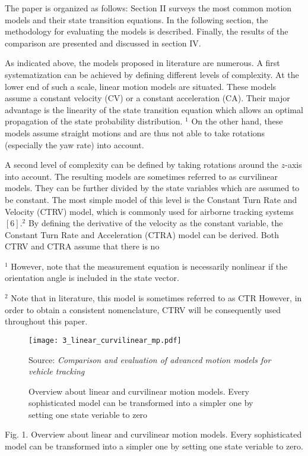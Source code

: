 The paper is organized as follows: Section II surveys the most common motion models and their state transition equations. In the following section, the methodology for evaluating the models is described. Finally, the results of the comparison are presented and discussed in section IV.

As indicated above, the models proposed in literature are numerous. A first systematization can be achieved by defining different levels of complexity. At the lower end of such a scale, linear motion models are situated. These models assume a constant velocity (CV) or a constant acceleration (CA). Their major advantage is the linearity of the state transition equation which allows an optimal propagation of the state probability distribution. ${ }^{1}$ On the other hand, these models assume straight motions and are thus not able to take rotations (especially the yaw rate) into account.

A second level of complexity can be defined by taking rotations around the $z$-axis into account. The resulting models are sometimes referred to as curvilinear models. They can be further divided by the state variables which are assumed to be constant. The most simple model of this level is the Constant Turn Rate and Velocity (CTRV) model, which is commonly used for airborne tracking systems $[6] .{ }^{2}$ By defining the derivative of the velocity as the constant variable, the Constant Turn Rate and Acceleration (CTRA) model can be derived. Both CTRV and CTRA assume that there is no

${ }^{1}$ However, note that the measurement equation is necessarily nonlinear if the orientation angle is included in the state vector.

${ }^{2}$ Note that in literature, this model is sometimes referred to as CTR However, in order to obtain a consistent nomenclature, CTRV will be consequently used throughout this paper.

\begin{figure}[h]
	\centering
	\texttt{[image: 3\_linear\_curvilinear\_mp.pdf]}
	\caption{Overview about linear and curvilinear motion models. Every sophisticated model can be transformed into a simpler one by setting one state veriable to zero}
	Source: \textit{Comparison and evaluation of advanced motion models for vehicle tracking} \cite{schubert2008comparison}
	\label{fig:3_linear_curvilinear_mp}
\end{figure}

Fig. 1. Overview about linear and curvilinear motion models. Every sophisticated model can be transformed into a simpler one by setting one state veriable to zero.

